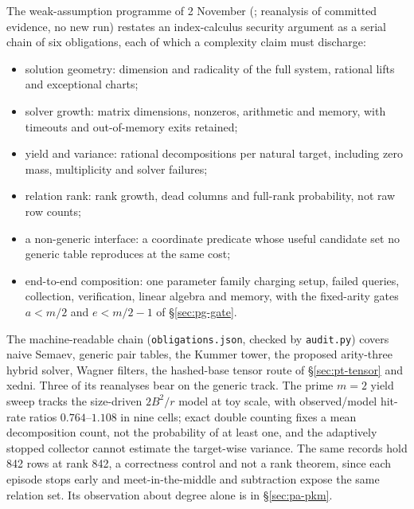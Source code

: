 The weak-assumption programme of 2 November
(; reanalysis of committed
evidence, no new run) restates an index-calculus security argument as a
serial chain of six obligations, each of which a complexity claim must
discharge:
\begin{itemize}
\item solution geometry: dimension and radicality of the full system,
  rational lifts and exceptional charts;
\item solver growth: matrix dimensions, nonzeros, arithmetic and memory,
  with timeouts and out-of-memory exits retained;
\item yield and variance: rational decompositions per natural target,
  including zero mass, multiplicity and solver failures;
\item relation rank: rank growth, dead columns and full-rank probability,
  not raw row counts;
\item a non-generic interface: a coordinate predicate whose useful
  candidate set no generic table reproduces at the same cost;
\item end-to-end composition: one parameter family charging setup, failed
  queries, collection, verification, linear algebra and memory, with the
  fixed-arity gates $a<m/2$ and $e<m/2-1$ of \S\ref{sec:pg-gate}.
\end{itemize}
The machine-readable chain (\texttt{obligations.json}, checked by
\texttt{audit.py}) covers naive Semaev, generic pair tables, the Kummer
tower, the proposed arity-three hybrid solver, Wagner filters, the
hashed-base tensor route of \S\ref{sec:pt-tensor} and xedni. Three of its
reanalyses bear on the generic track. The prime $m=2$ yield sweep tracks the
size-driven $2B^2/r$ model at toy scale, with observed/model hit-rate
ratios $0.764$--$1.108$ in nine cells; exact double counting fixes a mean
decomposition count, not the probability of at least one, and the
adaptively stopped collector cannot estimate the target-wise variance. The
same records hold 842 rows at rank 842, a correctness control and not a
rank theorem, since each episode stops early and meet-in-the-middle and
subtraction expose the same relation set. Its observation about degree
alone is in \S\ref{sec:pa-pkm}.

